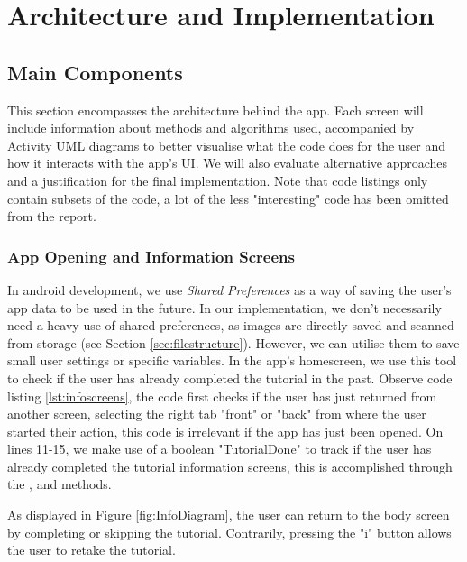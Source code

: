 \chapter{Architecture and Implementation}
\section{Main Components}
This section encompasses the architecture behind the app. Each screen will include information about methods and algorithms used, accompanied by Activity UML diagrams to better visualise what the code does for the user and how it interacts with the app's UI. We will also evaluate alternative approaches and a justification for the final implementation. Note that code listings only contain subsets of the code, a lot of the less "interesting" code has been omitted from the report.


\subsection{App Opening and Information Screens}

In android development, we use \emph{Shared Preferences} as a way of saving the user's app data to be used in the future. In our implementation, we don't necessarily need a heavy use of shared preferences, as images are directly saved and scanned from storage (see Section \ref{sec:filestructure}). However, we can utilise them to save small user settings or specific variables. In the app's homescreen, we use this tool to check if the user has already completed the tutorial in the past. Observe code listing \ref{lst:infoscreens}, the code first checks if the user has just returned from another screen, selecting the right tab "front" or "back" from where the user started their action, this code is irrelevant if the app has just been opened. On lines 11-15, we make use of a boolean "TutorialDone" to track if the user has already completed the tutorial information screens, this is accomplished through the ,  and  methods.

As displayed in Figure \ref{fig:InfoDiagram}, the user can return to the body screen by completing or skipping the tutorial. Contrarily, pressing the "i" button allows the user to retake the tutorial. 


